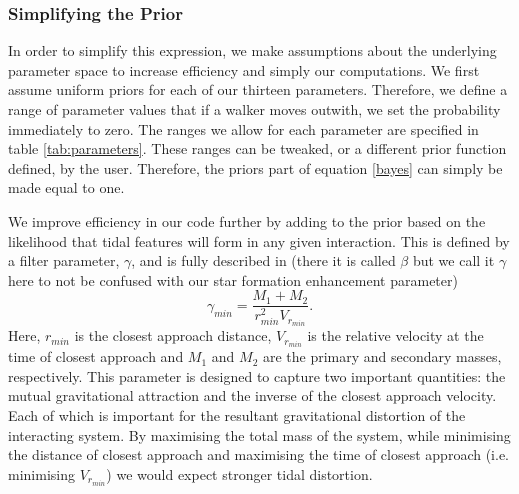 \subsubsection{Simplifying the Prior}
In order to simplify this expression, we make assumptions about the underlying parameter space to increase efficiency and simply our computations. We first assume uniform priors for each of our thirteen parameters. Therefore, we define a range of parameter values that if a walker moves outwith, we set the probability immediately to zero. The ranges we allow for each parameter are specified in table \ref{tab:parameters}. These ranges can be tweaked, or a different prior function defined, by the user. Therefore, the priors part of equation \ref{bayes} can simply be made equal to one.

We improve efficiency in our code further by adding to the prior based on the likelihood that tidal features will form in any given interaction. This is defined by a filter parameter, $\gamma$, and is fully described in \citet{2016MNRAS.459..720H} (there it is called $\beta$ but we call it $\gamma$ here to not be confused with our star formation enhancement parameter)
\begin{equation}\label{gamma_param}
    \gamma_{min} = \frac{M_{1} + M_{2}}{r_{min}^{2}V_{r_{min}}}.
\end{equation}
Here, $r_{min}$ is the closest approach distance, $V_{r_{min}}$ is the relative velocity at the time of closest approach and $M_{1}$ and $M_{2}$ are the primary and secondary masses, respectively. This parameter is designed to capture two important quantities: the mutual gravitational attraction and the inverse of the closest approach velocity. Each of which is important for the resultant gravitational distortion of the interacting system. By maximising the total mass of the system, while minimising the distance of closest approach and maximising the time of closest approach (i.e. minimising $V_{r_{min}}$) we would expect stronger tidal distortion. 

